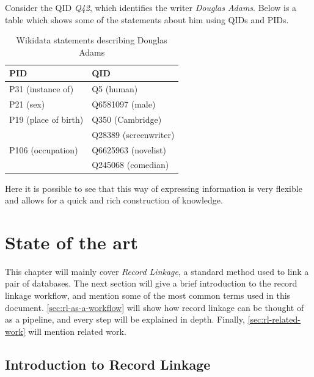 \documentclass[epsfig,a4paper,11pt,titlepage,twoside,openany]{book}
\begin{document}
Consider the QID \textit{Q42}, which identifies the writer
\textit{Douglas Adams}. Below is a table which shows some of the statements about him
using QIDs and PIDs.

\begin{table}[H]
  \centering
  \begin{tabular}{l|l}
    PID                                & QID                   \\ \hline
    P31 (instance of)                  & Q5 (human)            \\ \hline
    P21 (sex)                          & Q6581097 (male)       \\ \hline
    P19 (place of birth)               & Q350 (Cambridge)      \\ \hline
    \multirow{3}{*}{P106 (occupation)} & Q28389 (screenwriter) \\ \cline{2-2} 
                                       & Q6625963 (novelist)   \\ \cline{2-2} 
                                       & Q245068 (comedian)   
  \end{tabular}
  \caption{Wikidata statements describing Douglas Adams}
  \label{tab:intro-wikidata-douglas42}
\end{table}

Here it is possible to see that this way of expressing information is very
flexible and allows for a quick and rich construction of knowledge. 






\chapter{State of the art}
\label{chap:state-of-the-art}

This chapter will mainly cover \textit{Record Linkage}, a standard method used to link a pair of databases. The next section will give a brief introduction to the record linkage workflow, and mention some of the most common terms used in this document. \autoref{sec:rl-as-a-workflow} will show how record linkage can be thought of as a pipeline, and every step will be explained in depth. Finally, \autoref{sec:rl-related-work} will mention related work.

\section{Introduction to Record Linkage}
\label{sec:rl-intro}
\end{document}
